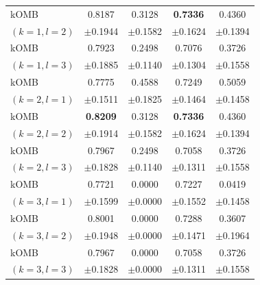 \begin{tabular}{lcccc}
kOMB
& 0.8187 & 0.3128 & \textbf{0.7336} & 0.4360 \\
{\scriptsize $(k=1,l=2)$} & {\scriptsize $\pm$0.1944} & {\scriptsize $\pm$0.1582} & {\scriptsize $\pm$0.1624} & {\scriptsize $\pm$0.1394} \\

kOMB
& 0.7923 & 0.2498 & 0.7076 & 0.3726 \\
{\scriptsize $(k=1,l=3)$} & {\scriptsize $\pm$0.1885} & {\scriptsize $\pm$0.1140} & {\scriptsize $\pm$0.1304} & {\scriptsize $\pm$0.1558} \\

kOMB
& 0.7775 & 0.4588 & 0.7249 & 0.5059 \\
{\scriptsize $(k=2,l=1)$} & {\scriptsize $\pm$0.1511} & {\scriptsize $\pm$0.1825} & {\scriptsize $\pm$0.1464} & {\scriptsize $\pm$0.1458} \\

kOMB
& \textbf{0.8209} & 0.3128 & \textbf{0.7336} & 0.4360 \\
{\scriptsize $(k=2,l=2)$} & {\scriptsize $\pm$0.1914} & {\scriptsize $\pm$0.1582} & {\scriptsize $\pm$0.1624} & {\scriptsize $\pm$0.1394} \\

kOMB
& 0.7967 & 0.2498 & 0.7058 & 0.3726 \\
{\scriptsize $(k=2,l=3)$} & {\scriptsize $\pm$0.1828} & {\scriptsize $\pm$0.1140} & {\scriptsize $\pm$0.1311} & {\scriptsize $\pm$0.1558} \\

kOMB
& 0.7721 & 0.0000 & 0.7227 & 0.0419 \\
{\scriptsize $(k=3,l=1)$} & {\scriptsize $\pm$0.1599} & {\scriptsize $\pm$0.0000} & {\scriptsize $\pm$0.1552} & {\scriptsize $\pm$0.1458} \\

kOMB
& 0.8001 & 0.0000 & 0.7288 & 0.3607 \\
{\scriptsize $(k=3,l=2)$} & {\scriptsize $\pm$0.1948} & {\scriptsize $\pm$0.0000} & {\scriptsize $\pm$0.1471} & {\scriptsize $\pm$0.1964} \\

kOMB
& 0.7967 & 0.0000 & 0.7058 & 0.3726 \\
{\scriptsize $(k=3,l=3)$} & {\scriptsize $\pm$0.1828} & {\scriptsize $\pm$0.0000} & {\scriptsize $\pm$0.1311} & {\scriptsize $\pm$0.1558} \\
\bottomrule
\end{tabular}
